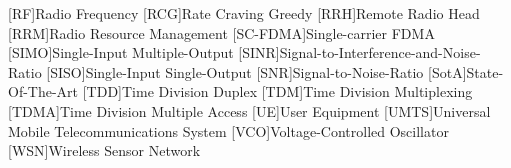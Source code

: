 \begin{acronym}[WINNER]
[RF]{Radio Frequency}
[RCG]{Rate Craving Greedy}
[RRH]{Remote Radio Head} %
[RRM]{Radio Resource Management}
[SC-FDMA]{Single-carrier FDMA} %
[SIMO]{Single-Input Multiple-Output}
[SINR]{Signal-to-Interference-and-Noise-Ratio}
[SISO]{Single-Input Single-Output}
[SNR]{Signal-to-Noise-Ratio}
[SotA]{State-Of-The-Art}
[TDD]{Time Division Duplex} %
[TDM]{Time Division Multiplexing}
[TDMA]{Time Division Multiple Access}
[UE]{User Equipment}
[UMTS]{Universal Mobile Telecommunications System} %
[VCO]{Voltage-Controlled Oscillator} %
[WSN]{Wireless Sensor Network} %

\end{acronym}

